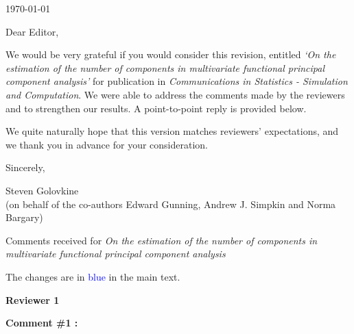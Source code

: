 \documentclass[11pt]{article}
\begin{document}
\qquad

\qquad

\qquad


\qquad

\qquad

\qquad

\newcommand{\thedate}{\today}

\thedate

\qquad

\qquad

\qquad



Dear Editor,

\qquad


We would be very grateful if you would consider this revision, entitled \emph{`On the estimation of the number of components in multivariate functional principal component analysis'} for publication in \emph{Communications in Statistics - Simulation and Computation}. We were able to address the comments made by the reviewers and to strengthen our results. A point-to-point reply is provided below. 

\quad

We quite naturally hope that this version matches reviewers' expectations, and we thank you in advance for your consideration.



\quad


Sincerely, 

\medskip



 Steven Golovkine 
 \\(on behalf of the co-authors  Edward Gunning, Andrew J. Simpkin and Norma Bargary)





\newpage


\begin{center}
{\large Comments received for \emph{On the estimation of the number of components in multivariate functional principal component analysis}}\\
\end{center} 


The changes are in \textcolor{blue}{blue} in the main text.
\vspace*{1cm}


{\large \textbf{Reviewer 1} }


\bigskip

\itshape


\textbf{Comment \#1 :}
\end{document}
